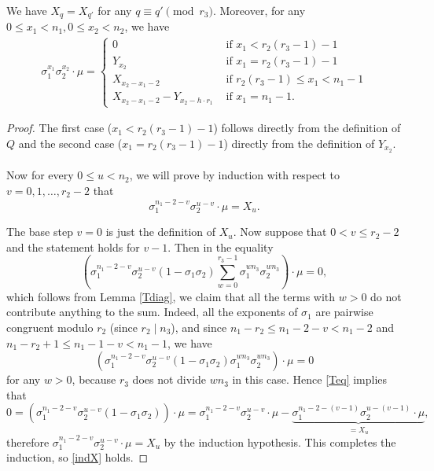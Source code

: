 \begin{lemma}\label{XY}
We have $X_q=X_{q'}$ for any $q\equiv q'\pmod {r_3}$. Moreover,
for any $0\leq x_1<n_1, 0\leq x_2<n_2$, we have
\begin{align*}
\sigma_1^{x_1}\sigma_2^{x_2}\cdot \mu=
\begin{cases}
0   &\text{ if }  x_1<r_2(r_3-1)-1\\
Y_{x_2} \quad &\text{ if } x_1=r_2(r_3-1)-1 \\
X_{x_2-x_1-2}  \quad &\text{ if } r_2(r_3-1)\leq x_1<n_1-1 \\
X_{x_2-x_1-2}-Y_{x_2-h\cdot r_1} &\text{ if }  x_1=n_1-1.
\end{cases}
\end{align*}
\end{lemma}
\begin{proof}

The first case ($x_1<r_2(r_3-1)-1$) follows directly from the definition of $Q$ and the second case ($x_1=r_2(r_3-1)-1$) directly from the definition of $Y_{x_2}$.

\paragraph*{}
Now for every $0\leq u <n_2$, we will prove by induction with respect to $v=0,1,\dots,r_2-2$ that 
\begin{equation}\label{indX}
\sigma_1^{n_1-2-v}\sigma_2^{u-v}\cdot \mu =X_u.
\end{equation}

The base step $v=0$ is just the definition of $X_u$. Now suppose that $0<v\leq r_2-2$ and the statement holds for $v-1$. Then in the equality
\begin{equation}\label{Teq}
\left(\sigma_1^{n_1-2-v}\sigma_2^{u-v}(1-\sigma_1\sigma_2)\sum_{w=0}^{r_3-1}\sigma_1^{wn_3}\sigma_2^{wn_3}\right)\cdot \mu=0,
\end{equation}
which follows from Lemma \ref{Tdiag}, we claim that all the terms with $w>0$ do not contribute anything to the sum. Indeed, all the exponents of $\sigma_1$ are pairwise congruent modulo $r_2$ (since $r_2\mid n_3$), and since $n_1-r_2\leq n_1-2-v<n_1-2$ and $n_1-r_2+1\leq n_1-1-v<n_1-1$, we have $$\left(\sigma_1^{n_1-2-v}\sigma_2^{u-v}(1-\sigma_1\sigma_2)\sigma_1^{wn_3}\sigma_2^{wn_3}\right)\cdot \mu=0$$ for any $w>0$, because  $r_3$ does not divide $wn_3$ in this case. Hence \eqref{Teq} implies that
$$0=\left(\sigma_1^{n_1-2-v}\sigma_2^{u-v}(1-\sigma_1\sigma_2)\right)\cdot \mu=\sigma_1^{n_1-2-v}\sigma_2^{u-v}\cdot \mu-\underbrace{\sigma_1^{n_1-2-(v-1)}\sigma_2^{u-(v-1)}\cdot \mu}_{=X_u},$$
therefore $\sigma_1^{n_1-2-v}\sigma_2^{u-v}\cdot \mu=X_u$ by the induction hypothesis. This completes the induction, so \eqref{indX} holds.


\end{proof}
